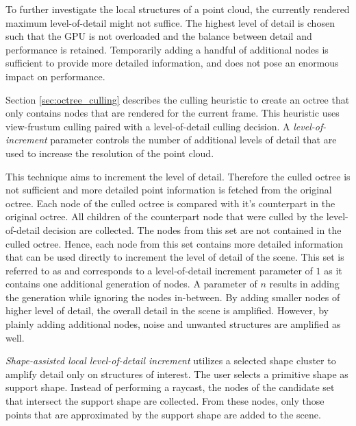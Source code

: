 To further investigate the local structures of a point cloud, the currently rendered maximum level-of-detail might not suffice. The highest level of detail is chosen such that the GPU is not overloaded and the balance between detail and performance is retained. Temporarily adding a handful of additional nodes is sufficient to provide more detailed information, and does not pose an enormous impact on performance. 
    
\par

Section \ref{sec:octree_culling} describes the culling heuristic to create an octree that only contains nodes that are rendered for the current frame. This heuristic uses view-frustum culling paired with a level-of-detail culling decision. A \textit{level-of-increment} parameter controls the number of additional levels of detail that are used to increase the resolution of the point cloud. 

\par

This technique aims to increment the level of detail. Therefore the culled octree is not sufficient and more detailed point information is fetched from the original octree. Each node of the culled octree is compared with it's counterpart in the original octree. All children of the counterpart node that were culled by the level-of-detail decision are collected. The nodes from this set are not contained in the culled octree. Hence, each node from this set contains more detailed information that can be used directly to increment the level of detail of the scene. This set is referred to as  and corresponds to a level-of-detail increment parameter of $1$ as it contains one additional generation of nodes. A parameter of $n$ results in adding the  generation while ignoring the nodes in-between. By adding smaller nodes of higher level of detail, the overall detail in the scene is amplified. However, by plainly adding additional nodes, noise and unwanted structures are amplified as well. 

\par
    
\textit{Shape-assisted local level-of-detail increment} utilizes a selected shape cluster to amplify detail only on structures of interest. The user selects a primitive shape as support shape. Instead of performing a raycast, the nodes of the candidate set that intersect the support shape are collected. From these nodes, only those points that are approximated by the support shape are added to the scene. 
    
